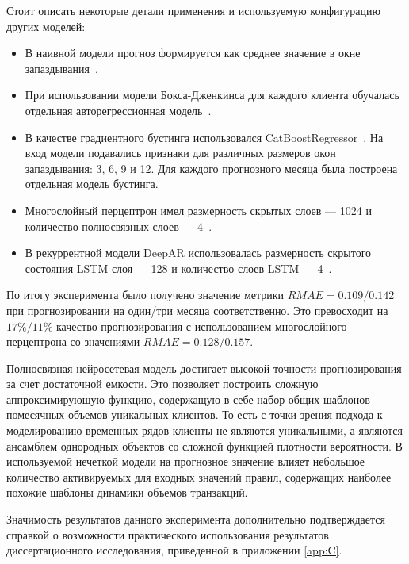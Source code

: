 Стоит описать некоторые детали применения и используемую конфигурацию других моделей:
\begin{itemize}
	\item В наивной модели прогноз формируется как среднее значение в окне запаздывания~\cite{Green2015}.
	\item При использовании модели Бокса-Дженкинса для каждого клиента обучалась отдельная авторегрессионная модель~\cite{BoxJenkins2015}.
	\item В качестве градиентного бустинга использовался CatBoostRegressor~\cite{Prokhorenkova2018CatBoost}. На вход модели подавались признаки для различных размеров окон запаздывания: 3, 6, 9 и 12. Для каждого прогнозного месяца была построена отдельная модель бустинга.
	\item Многослойный перцептрон имел размерность скрытых слоев --- 1024 и количество полносвязных слоев --- 4~\cite{Rumelhart1986Backprop}.
	\item В рекуррентной модели DeepAR использовалась размерность скрытого состояния LSTM-слоя --- 128 и количество слоев LSTM --- 4~\cite{Salinas2020DeepAR}.
\end{itemize}

По итогу эксперимента было получено значение метрики $RMAE = 0.109/0.142$ при прогнозировании на один/три месяца соответственно. Это превосходит на $17\%/11\%$ качество прогнозирования с использованием многослойного перцептрона со значениями $RMAE = 0.128/0.157$.

Полносвязная нейросетевая модель достигает высокой точности прогнозирования за счет достаточной емкости. Это позволяет построить сложную аппроксимирующую функцию, содержащую в себе набор общих шаблонов помесячных объемов уникальных клиентов. То есть с точки зрения подхода к моделированию временных рядов клиенты не являются уникальными, а являются ансамблем однородных объектов со сложной функцией плотности вероятности. В используемой нечеткой модели на прогнозное значение влияет небольшое количество активируемых для входных значений правил, содержащих наиболее похожие шаблоны динамики объемов транзакций.

Значимость результатов данного эксперимента дополнительно подтверждается справкой о возможности практического использования результатов диссертационного исследования, приведенной в приложении \ref{app:C}.


